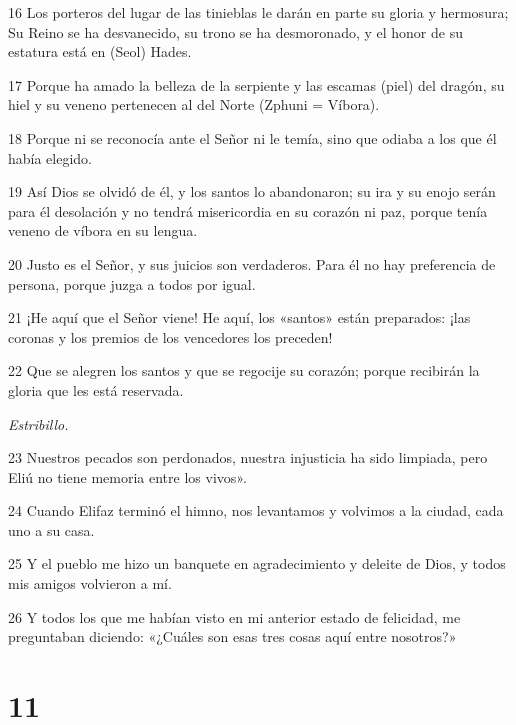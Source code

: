 \par 16 Los porteros del lugar de las tinieblas le darán en parte su gloria y hermosura; Su Reino se ha desvanecido, su trono se ha desmoronado, y el honor de su estatura está en (Seol) Hades.

\par 17 Porque ha amado la belleza de la serpiente y las escamas (piel) del dragón, su hiel y su veneno pertenecen al del Norte (Zphuni = Víbora).

\par 18 Porque ni se reconocía ante el Señor ni le temía, sino que odiaba a los que él había elegido.

\par 19 Así Dios se olvidó de él, y los santos lo abandonaron; su ira y su enojo serán para él desolación y no tendrá misericordia en su corazón ni paz, porque tenía veneno de víbora en su lengua.

\par 20 Justo es el Señor, y sus juicios son verdaderos. Para él no hay preferencia de persona, porque juzga a todos por igual.

\par 21 ¡He aquí que el Señor viene! He aquí, los «santos» están preparados: ¡las coronas y los premios de los vencedores los preceden!

\par 22 Que se alegren los santos y que se regocije su corazón; porque recibirán la gloria que les está reservada.

\par \textit{Estribillo.}

\par 23 Nuestros pecados son perdonados, nuestra injusticia ha sido limpiada, pero Eliú no tiene memoria entre los vivos».

\par 24 Cuando Elifaz terminó el himno, nos levantamos y volvimos a la ciudad, cada uno a su casa.

\par 25 Y el pueblo me hizo un banquete en agradecimiento y deleite de Dios, y todos mis amigos volvieron a mí.

\par 26 Y todos los que me habían visto en mi anterior estado de felicidad, me preguntaban diciendo: «¿Cuáles son esas tres cosas aquí entre nosotros?»

\chapter{11}

